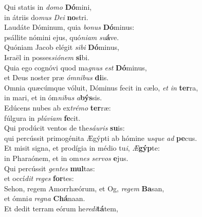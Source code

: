 \evenverse Qui statis in \textit{do}\textit{mo} \textbf{Dó}mini,~\*\\
\evenverse in átriis do\textit{mus} \textit{De}\textit{i} \textbf{no}stri.\\
\oddverse Laudáte Dóminum, quia \textit{bo}\textit{nus} \textbf{Dó}minus:~\*\\
\oddverse psállite nómini ejus, quó\textit{ni}\textit{am} \textit{su}\textbf{á}ve.\\
\evenverse Quóniam Jacob elégit \textit{si}\textit{bi} \textbf{Dó}minus,~\*\\
\evenverse Israël in posses\textit{si}\textit{ó}\textit{nem} \textbf{si}bi.\\
\oddverse Quia ego cognóvi quod ma\textit{gnus} \textit{est} \textbf{Dó}minus,~\*\\
\oddverse et Deus noster præ \textit{óm}\textit{ni}\textit{bus} \textbf{di}is.\\
\evenverse Omnia quæcúmque vóluit, Dóminus fecit in cælo, \textit{et} \textit{in} \textbf{ter}ra,~\*\\
\evenverse in mari, et in óm\textit{ni}\textit{bus} \textit{a}\textbf{býs}sis.\\
\oddverse Edúcens nubes ab ex\textit{tré}\textit{mo} \textbf{ter}ræ:~\*\\
\oddverse fúlgura in \textit{plú}\textit{vi}\textit{am} \textbf{fe}cit.\\
\evenverse Qui prodúcit ventos de the\textit{sáu}\textit{ris} \textbf{su}is:~\*\\
\evenverse qui percússit primogénita Ægýpti ab hómine \textit{us}\textit{que} \textit{ad} \textbf{pe}cus.\\
\oddverse Et misit signa, et prodígia in médio tu\textit{i}, \textit{Æ}\textbf{gýp}te:~\*\\
\oddverse in Pharaónem, et in om\textit{nes} \textit{ser}\textit{vos} \textbf{e}jus.\\
\evenverse Qui percússit \textit{gen}\textit{tes} \textbf{mul}tas:~\*\\
\evenverse et occí\textit{dit} \textit{re}\textit{ges} \textbf{for}tes:\\
\oddverse Sehon, regem Amorrhæórum, et Og, \textit{re}\textit{gem} \textbf{Ba}san,~\*\\
\oddverse et ómni\textit{a} \textit{re}\textit{gna} \textbf{Chá}naan.\\
\evenverse Et dedit terram eórum he\textit{re}\textit{di}\textbf{tá}tem,~\*\\
